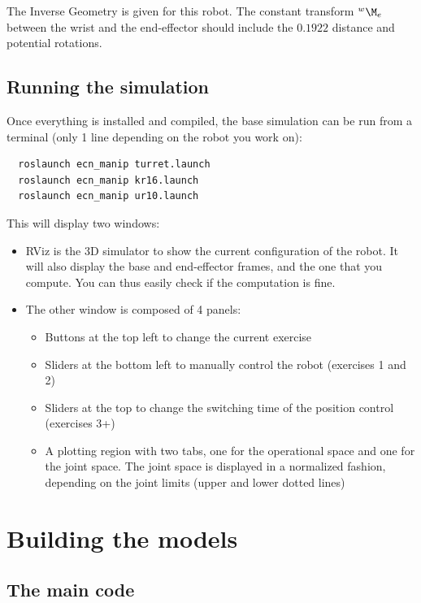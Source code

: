 \documentclass{ecnreport}
\begin{document}
  The Inverse Geometry is given for this robot. 
  The constant transform $\wMe$ between the wrist and the end-effector should include the $0.1922$ distance and potential rotations.
  
  
  \newpage
  \subsection{Running the simulation}
  
  Once everything is installed and compiled, the base simulation can be run from a terminal (only 1 line depending on the robot you work on):
  \cppstyle
  \begin{lstlisting}
  roslaunch ecn_manip turret.launch
  roslaunch ecn_manip kr16.launch
  roslaunch ecn_manip ur10.launch
  \end{lstlisting}
  
  This will display two windows:
  \begin{itemize}
    \item RViz is the 3D simulator to show the current configuration of the robot. It will also display the base and end-effector frames, and the one that you compute. You can thus easily check if the computation is fine.
    \item The other window is composed of 4 panels:
    \begin{itemize}
      \item Buttons at the top left to change the current exercise
      \item Sliders at the bottom left to manually control the robot (exercises 1 and 2)
      \item Sliders at the top to change the switching time of the position control (exercises 3+)
      \item A plotting region with two tabs, one for the operational space and one for the joint space. The joint space is displayed in a normalized fashion, depending on the joint limits (upper and lower dotted lines)
    \end{itemize}
  \end{itemize}
  
  
  \section{Building the models}
  
  \subsection*{The main code}
  
\end{document}
